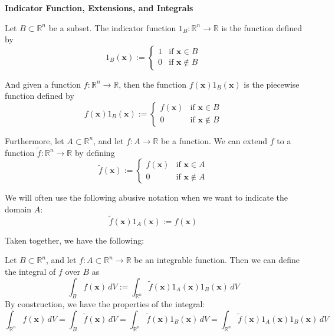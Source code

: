 \documentclass{article}
\newcommand{\R}{\mathbb{R}}
\newenvironment{definition}[1]{
    \par\noindent\textbf{#1}\par\noindent
}{
    \par \vspace{0.5cm}
}
\begin{document}
\begin{definition}{Indicator Function, Extensions, and Integrals}
    Let \( B \subset \R^n \) be a subset. The indicator function \( 1_B : \R^n \to \R \) is the function defined by
    \[ 1_B(\bm{x}) := \begin{cases} 
    1 & \text{if } \bm{x} \in B \\
    0 & \text{if } \bm{x} \notin B
    \end{cases} \]

    And given a function \( f : \R^n \to \R \), then the function \( f(\bm{x})1_B(\bm{x}) \) is the piecewise function defined by
    \[ f(\bm{x})1_B(\bm{x}) := \begin{cases} 
    f(\bm{x}) & \text{if } \bm{x} \in B \\
    0 & \text{if } \bm{x} \notin B
    \end{cases} \]

    \vspace{0.5cm}
    Furthermore, let \( A \subset \R^n \), and let \( f : A \to \R \) be a function. We can extend \( f \) to a function \( \tilde{f} : \R^n \to \R \) by defining
    \[ \tilde{f}(\bm{x}) := \begin{cases} 
    f(\bm{x}) & \text{if } \bm{x} \in A \\
    0 & \text{if } \bm{x} \notin A
    \end{cases} \]

    We will often use the following abusive notation when we want to indicate the domain \( A \):
    \[ \tilde{f}(\bm{x})1_A(\bm{x}) := f(\bm{x}) \]

    \vspace{0.5cm}
    Taken together, we have the following:

    Let \( B \subset \R^n \), and let \( f : A \subset \R^n \to \R \) be an integrable function. Then we can define the integral of \( f \) over \( B \) as
    \[ \int_B f(\bm{x}) \, dV := \int_{\R^n} \tilde{f}(\bm{x})1_A(\bm{x})1_B(\bm{x}) \, dV \]
    By construction, we have the properties of the integral:
    \[ \int_{\R^n} f(\bm{x}) \, dV = \int_B \tilde{f}(\bm{x}) \, dV = \int_{\R^n} \tilde{f}(\bm{x})1_B(\bm{x}) \, dV = \int_{\R^n} \tilde{f}(\bm{x})1_A(\bm{x})1_B(\bm{x}) \, dV \]
\end{definition}
\end{document}
